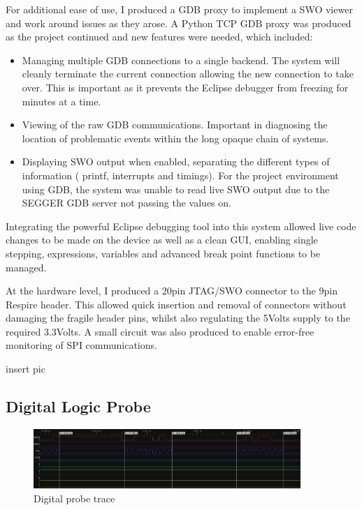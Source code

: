 For additional ease of use, I produced a \ac{GDB} proxy to implement a \ac{SWO} viewer and work around
issues as they arose. A Python TCP \ac{GDB} proxy was produced as the project continued and new
features were needed, which included:
\begin{itemize}
  \item Managing multiple \ac{GDB} connections to a single backend. The system will cleanly terminate
        the current connection allowing the new connection to take over. This is important as it
        prevents the Eclipse debugger from freezing for minutes at a time.
  \item Viewing of the raw \ac{GDB} communications. Important in diagnosing the location of
        problematic events within the long opaque chain of systems.
  \item Displaying \ac{SWO} output when enabled, separating the different types of information (\eg
        printf, interrupts and timings). For the project environment using GDB, the system was
        unable to read live \ac{SWO} output due to the SEGGER \ac{GDB} server not passing the values on.
\end{itemize}


Integrating the powerful Eclipse debugging tool into this system allowed live code changes to be
made on the device as well as a clean \ac{GUI}, enabling single stepping, expressions, variables and
advanced break point functions to be managed.


At the hardware level, I produced a 20pin \ac{JTAG}/\ac{SWO} connector to the 9pin Respire header. This
allowed quick insertion and removal of connectors without damaging the fragile header pins, whilst
also regulating the 5Volts supply to the required 3.3Volts. A small circuit was also produced to
enable error-free monitoring of \ac{SPI} communications.

{insert pic}


\subsection{Digital Logic Probe}

\begin{figure}
  \vspace{-10pt}
  \begin{center}
    \includegraphics[width=0.9\textwidth, keepaspectratio=true]{images/digital_probe.png}
  \end{center}
  \caption[Digital Probe Trace]{Digital probe trace}
  \label{digital_probe_example}
  \vspace{-10pt}
\end{figure}

